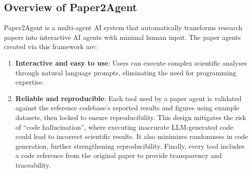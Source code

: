 \documentclass[11pt]{article}
\begin{document}
\subsection*{Overview of Paper2Agent}
Paper2Agent is a multi-agent AI system that automatically transforms research papers into interactive AI agents with minimal human input. The paper agents created via this framework are:
\begin{enumerate}
    \item \textbf{Interactive and easy to use}: Users can execute complex scientific analyses through natural language prompts, eliminating the need for programming expertise.
    \item \textbf{Reliable and reproducible}: Each tool used by a paper agent is validated against the reference codebase’s reported results and figures using example datasets, then locked to ensure reproducibility. This design mitigates the risk of “code hallucination”, where executing inaccurate LLM-generated code could lead to incorrect scientific results. It also minimizes randomness in code generation, further strengthening reproducibility. Finally, every tool includes a code reference from the original paper to provide transparency and traceability.
\end{enumerate}
\end{document}
